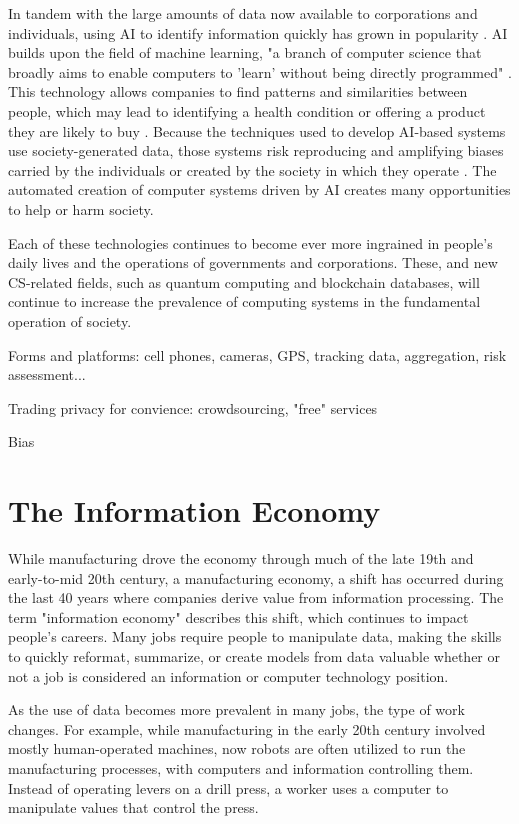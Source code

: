 In tandem with the large amounts of data now available to corporations and individuals, using AI to identify information quickly has grown in popularity \parencite{vinichenko_threats_2021}. AI builds upon the field of machine learning, "a branch of computer science that broadly aims to enable computers to 'learn' without being directly programmed" \parencite[p. 2222]{bi_what_2019}. This technology allows companies to find patterns and similarities between people, which may lead to identifying a health condition or offering a product they are likely to buy \parencite{fennelly_for_2021, ma_machine_2020}. Because the techniques used to develop AI-based systems use society-generated data, those systems risk reproducing and amplifying biases carried by the individuals or created by the society in which they operate \parencite{wiens_diagnosing_2020}. The automated creation of computer systems driven by AI creates many opportunities to help or harm society.

Each of these technologies continues to become ever more ingrained in people's daily lives and the operations of governments and corporations. These, and new CS-related fields, such as quantum computing and blockchain databases, will continue to increase the prevalence of computing systems in the fundamental operation of society.



Forms and platforms: cell phones, cameras, GPS, tracking data, aggregation, risk assessment... 

Trading privacy for convience: crowdsourcing, "free" services

Bias

\section{The Information Economy}

While manufacturing drove the economy through much of the late 19th and early-to-mid 20th century, a manufacturing economy, a shift has occurred during the last 40 years where companies derive value from information processing. The term "information economy" describes this shift, which continues to impact people's careers. Many jobs require people to manipulate data, making the skills to quickly reformat, summarize, or create models from data valuable whether or not a job is considered an information or computer technology position.

As the use of data becomes more prevalent in many jobs, the type of work changes. For example, while manufacturing in the early 20th century involved mostly human-operated machines, now robots are often utilized to run the manufacturing processes, with computers and information controlling them. Instead of operating levers on a drill press, a worker uses a computer to manipulate values that control the press.

